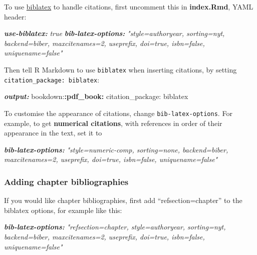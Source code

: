 \documentclass[a4paper, nobind]{templates/ociamthesis}
\newenvironment{Shaded}{\begin{snugshade}}{\end{snugshade}}
\newcommand{\AnnotationTok}[1]{\textcolor[rgb]{0.56,0.35,0.01}{\textbf{\textit{#1}}}}
\newcommand{\CommentTok}[1]{\textcolor[rgb]{0.56,0.35,0.01}{\textit{#1}}}
\newcommand{\NormalTok}[1]{#1}
\newcommand{\SpecialCharTok}[1]{\textcolor[rgb]{0.81,0.36,0.00}{\textbf{#1}}}
\renewenvironment{Shaded}
{
  \vspace{10pt}%
  \begin{snugshade}%
}{%
  \end{snugshade}%
  \vspace{8pt}%
}
\begin{document}
To use \href{https://www.overleaf.com/learn/latex/Bibliography_management_with_biblatex}{biblatex} to handle citations, first uncomment this in \textbf{index.Rmd}, YAML header:

\begin{Shaded}
\begin{Highlighting}[]
\AnnotationTok{use{-}biblatex:}\CommentTok{ true}
\AnnotationTok{bib{-}latex{-}options:}\CommentTok{ "style=authoryear, sorting=nyt, backend=biber, maxcitenames=2, useprefix, doi=true, isbn=false, uniquename=false"}
\end{Highlighting}
\end{Shaded}

Then tell R Markdown to use \texttt{biblatex} when inserting citations, by setting \texttt{citation\_package:\ biblatex}:

\begin{Shaded}
\begin{Highlighting}[]
\AnnotationTok{output:}
\NormalTok{  bookdown:}\SpecialCharTok{:pdf\_book:}
\NormalTok{    citation\_package: biblatex}
\end{Highlighting}
\end{Shaded}

To customise the appearance of citations, change \texttt{bib-latex-options}. For example, to get \textbf{numerical citations}, with references in order of their appearance in the text, set it to

\begin{Shaded}
\begin{Highlighting}[]
\AnnotationTok{bib{-}latex{-}options:}\CommentTok{ "style=numeric{-}comp, sorting=none, backend=biber, maxcitenames=2, useprefix, doi=true, isbn=false, uniquename=false"}
\end{Highlighting}
\end{Shaded}

\subsubsection{Adding chapter bibliographies}\label{adding-chapter-bibliographies}

If you would like chapter bibliographies, first add ``refsection=chapter'' to the biblatex options, for example like this:

\begin{Shaded}
\begin{Highlighting}[]
\AnnotationTok{bib{-}latex{-}options:}\CommentTok{ "refsection=chapter, style=authoryear, sorting=nyt, backend=biber, maxcitenames=2, useprefix, doi=true, isbn=false, uniquename=false"}
\end{Highlighting}
\end{Shaded}
\end{document}
